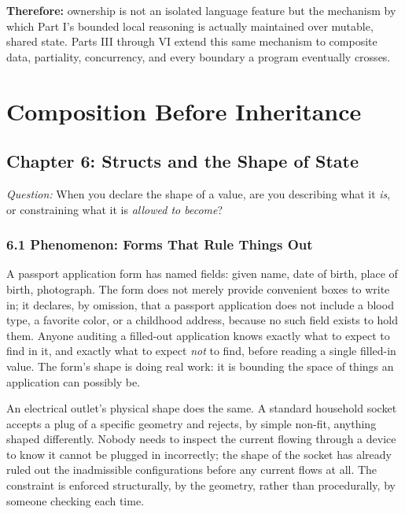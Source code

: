 \documentclass[11pt]{book}
\begin{document}
\noindent\textbf{Therefore:} ownership is not an isolated language feature but the mechanism by which Part I's bounded local reasoning is actually maintained over mutable, shared state. Parts III through VI extend this same mechanism to composite data, partiality, concurrency, and every boundary a program eventually crosses.



\clearpage

\part{Composition Before Inheritance}


\clearpage

\chapter*{Chapter 6: Structs and the Shape of State}

\begin{firstprinciples}
\textit{Question:} When you declare the shape of a value, are you describing what it \emph{is}, or constraining what it is \emph{allowed to become}?
\end{firstprinciples}

\section*{6.1 Phenomenon: Forms That Rule Things Out}

A passport application form has named fields: given name, date of birth, place of birth, photograph. The form does not merely provide convenient boxes to write in; it declares, by omission, that a passport application does not include a blood type, a favorite color, or a childhood address, because no such field exists to hold them. Anyone auditing a filled-out application knows exactly what to expect to find in it, and exactly what to expect \emph{not} to find, before reading a single filled-in value. The form's shape is doing real work: it is bounding the space of things an application can possibly be.

An electrical outlet's physical shape does the same. A standard household socket accepts a plug of a specific geometry and rejects, by simple non-fit, anything shaped differently. Nobody needs to inspect the current flowing through a device to know it cannot be plugged in incorrectly; the shape of the socket has already ruled out the inadmissible configurations before any current flows at all. The constraint is enforced structurally, by the geometry, rather than procedurally, by someone checking each time.
\end{document}
